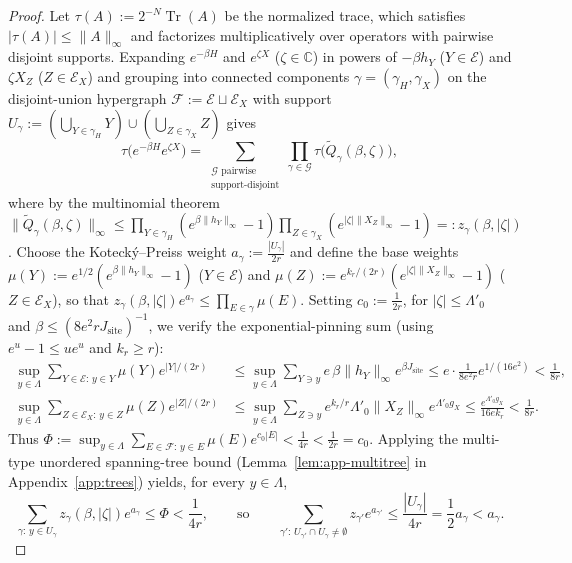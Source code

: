 \documentclass[11pt,a4paper]{article}
\numberwithin{equation}{section}
\theoremstyle{plain}
\theoremstyle{definition}
\newcommand{\Tr}{\operatorname{Tr}}
\begin{document}
\begin{proof}
Let $\tau(A) := 2^{-N}\Tr(A)$ be the normalized trace, which satisfies $|\tau(A)|\le\|A\|_\infty$ and factorizes multiplicatively over operators with pairwise disjoint supports. Expanding $e^{-\beta H}$ and $e^{\zeta X}$ ($\zeta\in\mathbb{C}$) in powers of $-\beta h_Y$ ($Y\in\mathcal{E}$) and $\zeta X_Z$ ($Z\in\mathcal{E}_X$) and grouping into connected components $\gamma = (\gamma_H,\gamma_X)$ on the disjoint-union hypergraph $\mathcal{F} := \mathcal{E}\sqcup\mathcal{E}_X$ with support $U_\gamma := (\bigcup_{Y\in\gamma_H}Y)\cup(\bigcup_{Z\in\gamma_X}Z)$ gives
\[
  \tau\bigl(e^{-\beta H}e^{\zeta X}\bigr) = \sum_{\substack{\mathcal{G}\text{ pairwise}\\\text{support-disjoint}}} \prod_{\gamma\in\mathcal{G}} \tau\bigl(\widetilde{Q}_\gamma(\beta,\zeta)\bigr),
\]
where by the multinomial theorem $\|\widetilde{Q}_\gamma(\beta,\zeta)\|_\infty \le \prod_{Y\in\gamma_H}(e^{\beta\|h_Y\|_\infty}-1)\prod_{Z\in\gamma_X}(e^{|\zeta|\|X_Z\|_\infty}-1) =: z_\gamma(\beta,|\zeta|)$. Choose the Koteck\'y--Preiss weight $a_\gamma := \frac{|U_\gamma|}{2r}$ and define the base weights $\mu(Y) := e^{1/2}(e^{\beta\|h_Y\|_\infty}-1)$ ($Y\in\mathcal{E}$) and $\mu(Z) := e^{k_r/(2r)}(e^{|\zeta|\|X_Z\|_\infty}-1)$ ($Z\in\mathcal{E}_X$), so that $z_\gamma(\beta,|\zeta|)e^{a_\gamma} \le \prod_{E\in\gamma}\mu(E)$. Setting $c_0 := \frac{1}{2r}$, for $|\zeta|\le\Lambda'_0$ and $\beta\le(8e^2 r J_{\mathrm{site}})^{-1}$, we verify the exponential-pinning sum (using $e^u-1\le u e^u$ and $k_r\ge r$):
\begin{align*}
  \sup_{y\in\Lambda}\sum_{Y\in\mathcal{E}:\, y\in Y} \mu(Y)e^{|Y|/(2r)}
  &\le \sup_{y\in\Lambda}\sum_{Y\ni y} e\,\beta\|h_Y\|_\infty e^{\beta J_{\mathrm{site}}}
   \le e\cdot\frac{1}{8e^2 r}e^{1/(16e^2)} < \frac{1}{8r}, \\
  \sup_{y\in\Lambda}\sum_{Z\in\mathcal{E}_X:\, y\in Z} \mu(Z)e^{|Z|/(2r)}
  &\le \sup_{y\in\Lambda}\sum_{Z\ni y} e^{k_r/r}\Lambda'_0\|X_Z\|_\infty e^{\Lambda'_0 g_X}
   \le \frac{e^{\Lambda'_0 g_X}}{16e k_r} < \frac{1}{8r}.
\end{align*}
Thus $\Phi := \sup_{y\in\Lambda}\sum_{E\in\mathcal{F}:\, y\in E}\mu(E)e^{c_0|E|} < \frac{1}{4r} < \frac{1}{2r} = c_0$. Applying the multi-type unordered spanning-tree bound (Lemma~\ref{lem:app-multitree} in Appendix~\ref{app:trees}) yields, for every $y\in\Lambda$,
\[
  \sum_{\gamma:\, y\in U_\gamma} z_\gamma(\beta,|\zeta|) e^{a_\gamma}
  \le \Phi < \frac{1}{4r}, \qquad\text{so}\qquad
  \sum_{\gamma':\, U_{\gamma'}\cap U_\gamma\ne\emptyset} z_{\gamma'} e^{a_{\gamma'}} \le \frac{|U_\gamma|}{4r} = \frac{1}{2}a_\gamma < a_\gamma.
\]
\end{proof}
\end{document}
